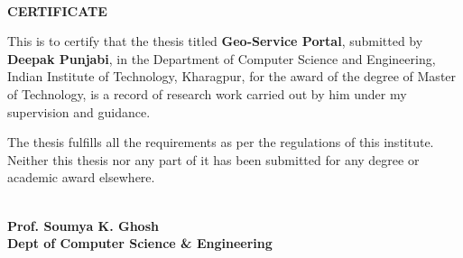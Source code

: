 \thispagestyle{empty}
{~} %
\vspace{10em} %
\begin{center}
\textbf{\large CERTIFICATE}
\end{center}
This is to certify that the thesis titled \textbf{Geo-Service Portal}, submitted by \textbf{Deepak Punjabi}, in the Department of Computer Science and Engineering, Indian Institute of Technology, Kharagpur, for the award of the degree of Master of Technology, is a record of research work carried out by him under my supervision and guidance.

The thesis fulfills all the requirements as per the regulations of this institute. Neither this thesis nor any part of it has been submitted for any degree or academic award elsewhere.
\\
\\
\begin{flushright}
\textbf{Prof. Soumya K. Ghosh}\\
\textbf{Dept of Computer Science \& Engineering}
\end{flushright}

\clearpage


